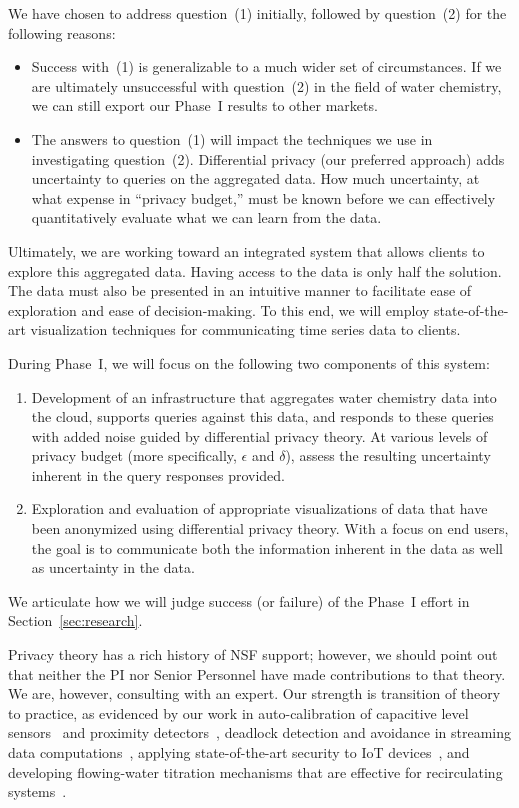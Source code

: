 We have chosen to address question~(1) initially, followed by question~(2)
for the following reasons:
\begin{itemize}
\item Success with~(1) is generalizable to a much wider set of circumstances.
If we are ultimately unsuccessful with question~(2) in the field of water
chemistry, we can still export our Phase~I results to other markets.
\item The answers to question~(1) will impact the techniques we use in
investigating question~(2). Differential privacy (our preferred approach)
adds uncertainty to queries on the aggregated data. How much uncertainty, at
what expense in ``privacy budget,'' must be known before we can effectively
quantitatively evaluate what we can learn from the data.
\end{itemize}

Ultimately, we are working toward an integrated system that allows clients to explore this aggregated data.
Having access to the data is only half the solution. 
The data must also be presented in an intuitive manner to facilitate ease of exploration and ease of decision-making. 
To this end, we will employ state-of-the-art visualization techniques for communicating time series data to clients. 

During Phase~I, we will focus on the following two components of this
system:
\begin{enumerate}
\item Development of an infrastructure that aggregates water chemistry
data into the cloud, supports queries against this data, and responds to
these queries with added noise guided by differential privacy theory.
At various levels of privacy budget (more specifically,
$\epsilon$ and $\delta$), assess the resulting uncertainty inherent
in the query responses provided.
\item Exploration and evaluation of appropriate visualizations of data that have been
anonymized using differential privacy theory.  With a focus on end users,
the goal is to communicate both the information inherent in the data as well
as uncertainty in the data.
\end{enumerate}
We articulate how we will judge success (or failure) of the Phase~I effort
in Section~\ref{sec:research}.

Privacy theory has a rich history of NSF support; however, we should point
out that neither the PI nor Senior Personnel have made
contributions to that theory.  We are, however, consulting with an expert.
Our strength is
transition of theory to practice, as evidenced by our work in
auto-calibration of capacitive level sensors~\cite{lc03}
and proximity detectors~\cite{prox},
deadlock detection and avoidance in streaming data computations~\cite{labcl10},
applying state-of-the-art security to IoT devices~\cite{ccgss16,ccgss17b},
and developing flowing-water titration mechanisms that are effective
for recirculating systems~\cite{cesw17}.

